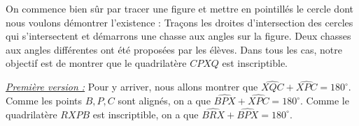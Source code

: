 \begin{sol}
On commence bien sûr par tracer une figure et mettre en pointillés le cercle dont nous voulons démontrer l'existence :
\newline
Traçons les droites d'intersection des cercles qui s'intersectent et démarrons une chasse aux angles sur la figure. Deux chasses aux angles différentes ont été proposées par les élèves. Dans tous les cas, notre objectif est de montrer que le quadrilatère $CPXQ$ est inscriptible.

\underline{\textit{Première version :}} Pour y arriver, nous allons montrer que $\widehat{XQC}+\widehat{XPC}=180^\circ$.
\newline
Comme les points $B,P,C$ sont alignés, on a que $\widehat{BPX}+\widehat{XPC}=180^\circ$. Comme le quadrilatère $RXPB$ est inscriptible, on a que $\widehat{BRX}+\widehat{BPX}=180^\circ$.


\end{sol}
